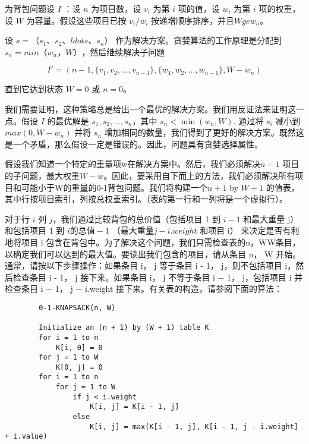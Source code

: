 \documentclass[a4paper, justified]{tufte-handout}
\begin{document}
\begin{solution}

	为背包问题设 $I$ ：设 $n$ 为项目数，设 $v_i$ 为第 $i$ 项的值，设 $w_i$ 为第 $i$ 项的权重，设 $W$ 为容量。假设这些项目已按 $v_i / w_i$ 按递增顺序排序，并且$W ge w_n$。

	设 $s = （s_1、s_2、ldots、s_n）$ 作为解决方案。贪婪算法的工作原理是分配到 $s_n = min（w_n， W）$，然后继续解决子问题

	$$I' = (n - 1, \{v_1, v_2, \ldots, v_{n - 1}\}, \{w_1, w_2, \ldots, w_{n - 1}\}, W - w_n)$$

	直到它达到状态 $W = 0$ 或 $n = 0$。

	我们需要证明，这种策略总是给出一个最优的解决方案。我们用反证法来证明这一点。假设 $I$ 的最优解是 $s_1, s_2, \ldots, s_n$​，其中 $s_n < \min(w_n, W)$. 通过将 $s_i$ 减小到 $max(0, W - w_n)$ 并将 $s_n$ 增加相同的数量，我们得到了更好的解决方案。既然这是一个矛盾，那么假设一定是错误的。因此，问题具有贪婪选择属性。
\end{solution}

\begin{problem}[TC 16.2-2]
\end{problem}

\begin{solution}

	假设我们知道一个特定的重量项w在解决方案中。然后，我们必须解决$n − 1$ 项目的子问题，最大权重$W − w$。因此，要采用自下而上的方法，我们必须解决所有项目和可能小于W的重量的0-1背包问题。我们将构建一个$n + 1$ by $W + 1$ 的值表，其中行按项目索引，列按总权重索引。（表的第一行和一列将是一个虚拟行）。


	对于行 $i$ 列 $j$，我们通过比较背包的总价值（包括项目 1 到 $i − 1$ 和最大重量 j）和包括项目 1 到 $i 的总值 − 1$ （最大重量$j − i.weight$ 和项目 i） 来决定是否有利地将项目 i 包含在背包中。为了解决这个问题，我们只需检查表的n，WW条目，以确定我们可以达到的最大值。要读出我们包含的项目，请从条目 n， W 开始。通常，请按以下步骤操作：如果条目 i， j 等于条目 i - 1， j，则不包括项目 i，然后检查条目 i - 1， j 接下来。如果条目 i， j 不等于条目 i − 1， j，包括项目 i 并检查条目 i − 1， j − i.weight 接下来。有关表的构造，请参阅下面的算法：

	\begin{verbatim}
		0-1-KNAPSACK(n, W)

	    Initialize an (n + 1) by (W + 1) table K
        for i = 1 to n
            K[i, 0] = 0
        for j = 1 to W
            K[0, j] = 0
        for i = 1 to n
            for j = 1 to W
                if j < i.weight
                    K[i, j] = K[i - 1, j]
                else
                    K[i, j] = max(K[i - 1, j], K[i - 1, j - i.weight] + i.value)
	\end{verbatim}
\end{solution}
\end{document}
